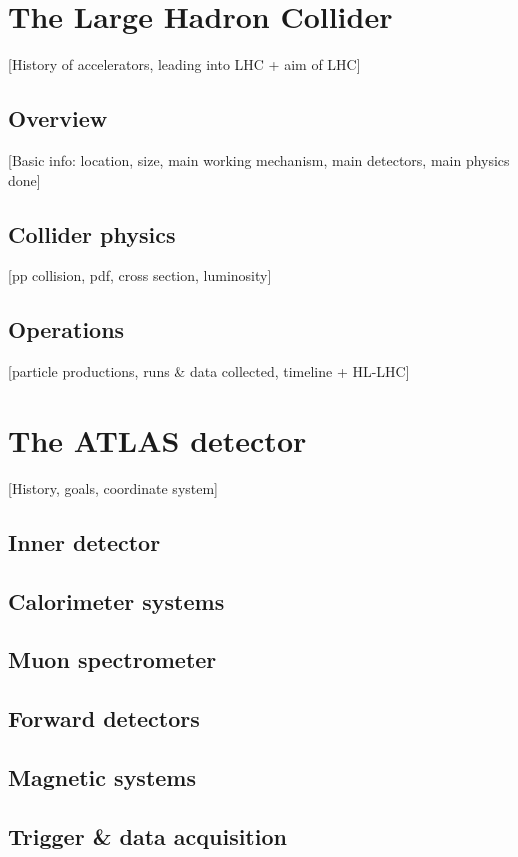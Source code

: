 \documentclass[../thesis.tex]{subfiles}
\begin{document}
\vspace{-1\baselineskip}

\section{The Large Hadron Collider}
\label{sec:LHC}
[History of accelerators, leading into LHC + aim of LHC]

\subsection{Overview}
[Basic info: location, size, main working mechanism, main detectors, main physics done]

\subsection{Collider physics}
[pp collision, pdf, cross section, luminosity]

\subsection{Operations}
[particle productions, runs \& data collected, timeline + HL-LHC]


\section{The ATLAS detector}
\label{sec:ATLAS}
[History, goals, coordinate system]

\subsection{Inner detector}
\subsection{Calorimeter systems}
\subsection{Muon spectrometer}
\subsection{Forward detectors}
\subsection{Magnetic systems}
\subsection{Trigger \& data acquisition}
\end{document}

